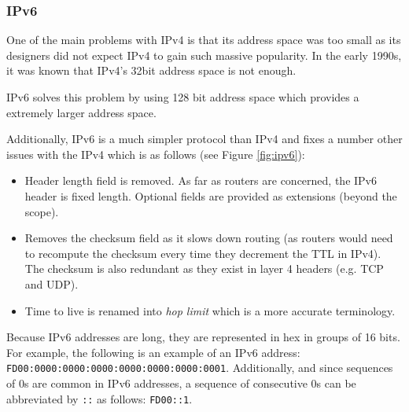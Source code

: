 \documentclass[pdftex,12pt,a4paper]{article}
\begin{document}
            \subsubsection{IPv6}
                One of the main problems with IPv4 is that its address space
                was too small as its designers did not expect IPv4 to gain such
                massive popularity. In the early 1990s, it was known that
                IPv4's 32bit address space is not enough.

                IPv6 solves this problem by using 128 bit address space which
                provides a extremely larger address space. 

                Additionally, IPv6 is a much simpler protocol than IPv4 and
                fixes a number other issues with the IPv4 which is as follows
                (see Figure \ref{fig:ipv6}):
                \begin{itemize}
                    \item Header length field is removed. As far as routers are concerned, the IPv6 header is
                        fixed length. Optional fields are provided as
                        extensions (beyond the scope).
                    \item Removes the checksum field as it slows down routing
                        (as routers would need to recompute the checksum
                        every time they decrement the TTL in IPv4). The
                        checksum is also redundant as they exist in layer 4
                        headers (e.g. TCP and UDP).
                    \item Time to live is renamed into \emph{hop limit} which
                        is a more accurate terminology.
                \end{itemize}

                Because IPv6 addresses are long, they are represented in hex in
                groups of 16 bits. For example, the following is an example of
                an IPv6 address:
                \texttt{FD00:0000:0000:0000:0000:0000:0000:0001}. Additionally,
                and since sequences of 0s are common in IPv6 addresses, a
                sequence of consecutive 0s can be abbreviated by \texttt{::} as
                follows: \texttt{FD00::1}.
\end{document}
